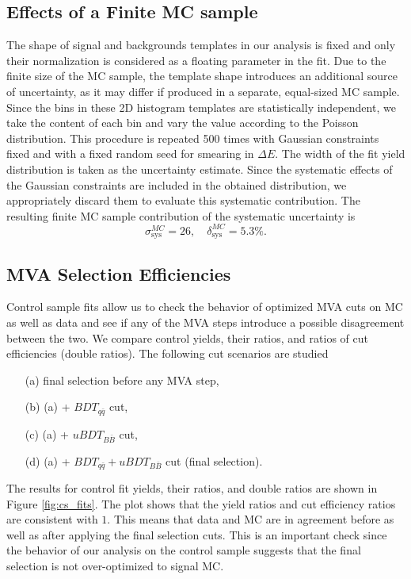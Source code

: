\subsection{Effects of a Finite MC sample}
The shape of signal and backgrounds templates in our analysis is fixed and only their normalization is considered as a floating parameter in the fit. Due to the finite size of the MC sample, the template shape introduces an additional source of uncertainty, as it may differ if produced in a separate, equal-sized MC sample. Since the bins in these 2D histogram templates are statistically independent, we take the content of each bin and vary the value according to the Poisson distribution. This procedure is repeated 500 times with Gaussian constraints fixed and with a fixed random seed for smearing in $\Delta E$. The width of the fit yield distribution is taken as the uncertainty estimate. Since the systematic effects of the Gaussian constraints are included in the obtained distribution, we appropriately discard them to evaluate this systematic contribution. The resulting finite MC sample contribution of the systematic uncertainty is
\begin{equation}
\sigma_{\mathrm{sys}}^{MC} = 26,\quad \delta_{\mathrm{sys}}^{MC} = 5.3\%.
\end{equation}


\subsection{MVA Selection Efficiencies}
Control sample fits allow us to check the behavior of optimized MVA cuts on MC as well as data and see if any of the MVA steps introduce a possible disagreement between the two. We compare control yields, their ratios, and ratios of cut efficiencies (double ratios). The following cut scenarios are studied
\begin{itemize}
	\item[(a)] final selection before any MVA step,
	\item[(b)] (a) + $BDT_{q\bar q}$ cut,
	\item[(c)] (a) + $uBDT_{B\bar B}$ cut,
	\item[(d)] (a) + $BDT_{q\bar q} + uBDT_{B\bar B}$ cut (final selection).
\end{itemize}

The results for control fit yields, their ratios, and double ratios are shown in Figure \ref{fig:cs_fits}. The plot shows that the yield ratios and cut efficiency ratios are consistent with $1$. This means that data and MC are in agreement before as well as after applying the final selection cuts. This is an important check since the behavior of our analysis on the control sample suggests that the final selection is not over-optimized to signal MC.

